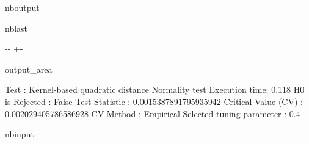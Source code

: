 \documentclass[letterpaper,10pt,english,openany,oneside]{sphinxmanual}
\begin{document}
\begin{sphinxuseclass}{nboutput}
\begin{sphinxuseclass}{nblast}
{

\kern-\sphinxverbatimsmallskipamount\kern-\baselineskip
\kern+\FrameHeightAdjust\kern-\fboxrule
\vspace{\nbsphinxcodecellspacing}

\begin{sphinxuseclass}{output_area}
\begin{sphinxuseclass}{}


\begin{sphinxVerbatim}[commandchars=\\\{\}]
Test : Kernel-based quadratic distance Normality test
Execution time: 0.118
H0 is Rejected : False
Test Statistic : 0.0015387891795935942
Critical Value (CV) : 0.002029405786586928
CV Method : Empirical
Selected tuning parameter : 0.4
\end{sphinxVerbatim}



\end{sphinxuseclass}
\end{sphinxuseclass}
}

\end{sphinxuseclass}
\end{sphinxuseclass}
\begin{sphinxuseclass}{nbinput}
{
\begin{sphinxVerbatim}[commandchars=\\\{\}]
\llap{\color{nbsphinxin}[5]:\,\hspace{\fboxrule}\hspace{\fboxsep}}
\end{sphinxVerbatim}
}

\end{sphinxuseclass}
\end{document}
